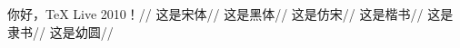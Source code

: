 \documentclass{ctexart}
\begin{document}
你好，TeX Live 2010！//
{\songti 这是宋体}//
{\heiti 这是黑体}//
{\fangsong 这是仿宋}//
{\kaishu 这是楷书}//
{\lishu 这是隶书}//
{\youyuan 这是幼圆}//
\end{document}

